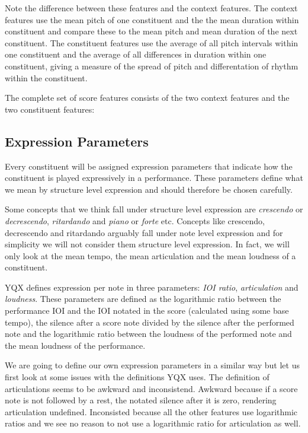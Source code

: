 \documentclass[a4paper,10pt]{article}
\begin{document}
Note the difference between these features and the context features. The context features use the mean pitch of one constituent and the the mean duration within constituent and compare these to the mean pitch and mean duration of the next constituent. The constituent features use the average of all pitch intervals within one constituent and the average of all differences in duration within one constituent, giving a measure of the spread of pitch and differentation of rhythm within the constituent.

The complete set of score features consists of the two context features and the two constituent features:



\subsection{Expression Parameters}
\label{sec:targets}

Every constituent will be assigned expression parameters that indicate how the constituent is played expressively in a performance. These parameters define what we mean by structure level expression and should therefore be chosen carefully. 

Some concepts that we think fall under structure level expression are \textit{crescendo} or \textit{decrescendo}, \textit{ritardando} and \textit{piano} or \textit{forte} etc.
Concepts like crescendo, decrescendo and ritardando arguably fall under note level expression and for simplicity we will not consider them structure level expression. In fact, we will only look at the mean tempo, the mean articulation and the mean loudness of a constituent.

YQX defines expression per note in three parameters: \textit{IOI ratio}, \textit{articulation} and \textit{loudness}. These parameters are defined as the logarithmic ratio between the performance IOI and the IOI notated in the score (calculated using some base tempo), the silence after a score note divided by the silence after the performed note and the logarithmic ratio between the loudness of the performed note and the mean loudness of the performance. 

We are going to define our own expression parameters in a similar way but let us first look at some issues with the definitions YQX uses. The definition of articulations seems to be awkward and inconsistend. Awkward because if a score note is not followed by a rest, the notated silence after it is zero, rendering articulation undefined. Inconsisted because all the other features use logarithmic ratios and we see no reason to not use a logarithmic ratio for articulation as well. 
\end{document}
